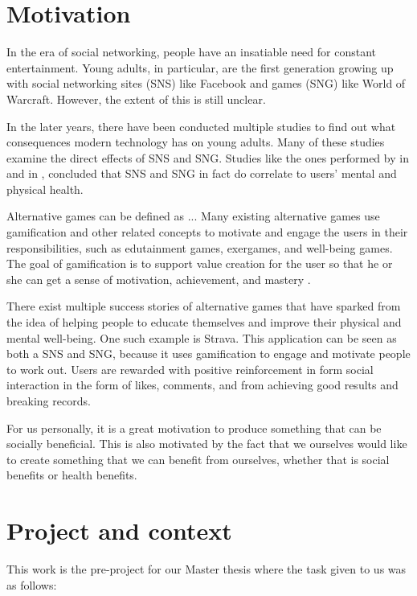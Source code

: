\documentclass[../Main.tex]{subfiles}
\begin{document}
\section{Motivation}
In the era of social networking, people have an insatiable need for constant entertainment. Young adults, in particular, are the first generation growing up with social networking sites (SNS) like Facebook and games (SNG) like World of Warcraft. However, the extent of this is still unclear.

In the later years, there have been conducted multiple studies to find out what consequences modern technology has on young adults. Many of these studies examine the direct effects of SNS and SNG. Studies like the ones performed by \citeauthor{pantic_online_2014} in \citeyear{pantic_online_2014} and \citeauthor{mentzoni_problematic_2011} in \citeyear{mentzoni_problematic_2011}, concluded that SNS and SNG in fact do correlate to users’ mental and physical health. 

Alternative games can be defined as ... Many existing alternative games use gamification and other related concepts to motivate and engage the users in their responsibilities, such as edutainment games, exergames, and well-being games. The goal of gamification is to support value creation for the user so that he or she can get a sense of motivation, achievement, and mastery \cite{hamari_social_2013}. 

There exist multiple success stories of alternative games that have sparked from the idea of helping people to educate themselves and improve their physical and mental well-being. One such example is Strava. This application can be seen as both a SNS and SNG, because it uses gamification to engage and motivate people to work out. Users are rewarded with positive reinforcement in form social interaction in the form of likes, comments, and from achieving good results and breaking records.

For us personally, it is a great motivation to produce something that can be socially beneficial. This is also motivated by the fact that we ourselves would like to create something that we can benefit from ourselves, whether that is social benefits or health benefits.
\clearpage

\section{Project and context}
This work is the pre-project for our Master thesis where the task given to us was as follows:
\end{document}
